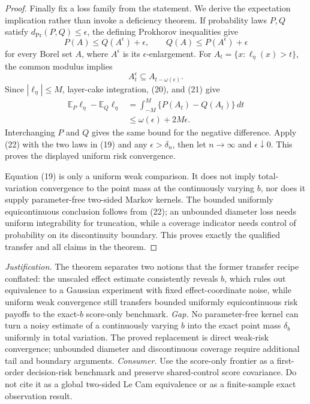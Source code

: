 \documentclass{article}
\begin{document}
\begin{proof}
Finally fix a loss family from the statement. We derive the expectation implication rather than invoke a deficiency theorem. If probability laws \(P,Q\) satisfy \(d_{\mathrm{Pr}}(P,Q)\leq\epsilon\), the defining Prokhorov inequalities give
\[
 P(A)\leq Q(A^\epsilon)+\epsilon,
 \qquad
 Q(A)\leq P(A^\epsilon)+\epsilon
 \tag{20}
\]
for every Borel set \(A\), where \(A^\epsilon\) is its \(\epsilon\)-enlargement. For \(A_t=\{x:\ell_\eta(x)>t\}\), the common modulus implies
\[
 A_t^\epsilon\subseteq A_{t-\omega(\epsilon)}.
 \tag{21}
\]
Since \(|\ell_\eta|\leq M\), layer-cake integration, (20), and (21) give
\[
 \begin{aligned}
 \mathbb E_P\ell_\eta-\mathbb E_Q\ell_\eta
 &=\int_{-M}^{M}\{P(A_t)-Q(A_t)\}\,dt\\
 &\leq\omega(\epsilon)+2M\epsilon.
 \end{aligned}
 \tag{22}
\]
Interchanging \(P\) and \(Q\) gives the same bound for the negative difference. Apply (22) with the two laws in (19) and any \(\epsilon>\delta_n\), then let \(n\to\infty\) and \(\epsilon\downarrow0\). This proves the displayed uniform risk convergence.

Equation (19) is only a uniform weak comparison. It does not imply total-variation convergence to the point mass at the continuously varying \(b\), nor does it supply parameter-free two-sided Markov kernels. The bounded uniformly equicontinuous conclusion follows from (22); an unbounded diameter loss needs uniform integrability for truncation, while a coverage indicator needs control of probability on its discontinuity boundary. This proves exactly the qualified transfer and all claims in the theorem.
\end{proof}
\par\smallskip\noindent \textit{Justification.} The theorem separates two notions that the former transfer recipe conflated: the unscaled effect estimate consistently reveals \(b\), which rules out equivalence to a Gaussian experiment with fixed effect-coordinate noise, while uniform weak convergence still transfers bounded uniformly equicontinuous risk payoffs to the exact-\(b\) score-only benchmark. \textit{Gap.} No parameter-free kernel can turn a noisy estimate of a continuously varying \(b\) into the exact point mass \(\delta_b\) uniformly in total variation. The proved replacement is direct weak-risk convergence; unbounded diameter and discontinuous coverage require additional tail and boundary arguments. \textit{Consumer.} Use the score-only frontier as a first-order decision-risk benchmark and preserve shared-control score covariance. Do not cite it as a global two-sided Le Cam equivalence or as a finite-sample exact observation result.
\end{document}

